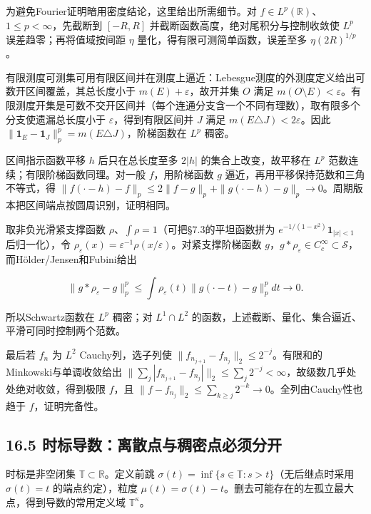 \documentclass[11pt,a4paper]{article}
\begin{document}
为避免Fourier证明暗用密度结论，这里给出所需细节。对
\(f\in L^p(\mathbb R)\)、\(1\le p<\infty\)，先截断到 \([-R,R]\)
并截断函数高度，绝对尾积分与控制收敛使 \(L^p\) 误差趋零；再将值域按间距
\(\eta\) 量化，得有限可测简单函数，误差至多 \(\eta(2R)^{1/p}\)。

有限测度可测集可用有限区间并在测度上逼近：Lebesgue测度的外测度定义给出可数开区间覆盖，其总长度小于
\(m(E)+\varepsilon\)，故开并集 \(O\) 满足
\(m(O\setminus E)<\varepsilon\)。有限测度开集是可数不交开区间并（每个连通分支含一个不同有理数），取有限多个分支使遗漏总长度小于
\(\varepsilon\)，得到有限区间并 \(J\) 满足
\(m(E\triangle J)<2\varepsilon\)。因此
\(\|\mathbf1_E-\mathbf1_J\|_p^p=m(E\triangle J)\)，阶梯函数在 \(L^p\)
稠密。

区间指示函数平移 \(h\) 后只在总长度至多 \(2|h|\) 的集合上改变，故平移在
\(L^p\) 范数连续；有限阶梯函数同理。对一般 \(f\)，用阶梯函数 \(g\)
逼近，再用平移保持范数和三角不等式，得
\(\|f(\cdot-h)-f\|_p\le2\|f-g\|_p+\|g(\cdot-h)-g\|_p\to0\)。周期版本把区间端点按圆周识别，证明相同。

取非负光滑紧支撑函数 \(\rho\)、\(\int\rho=1\)（可把§7.3的平坦函数拼为
\(e^{-1/(1-x^2)}\mathbf1_{|x|<1}\) 后归一化），令
\(\rho_\varepsilon(x)=\varepsilon^{-1}\rho(x/\varepsilon)\)。对紧支撑阶梯函数
\(g\)，\(g*\rho_\varepsilon\in C_c^\infty\subset\mathcal S\)，而Hölder/Jensen和Fubini给出

\[
\|g*\rho_\varepsilon-g\|_p^p
\le\int\rho_\varepsilon(t)\|g(\cdot-t)-g\|_p^pdt\to0.
\]

所以Schwartz函数在 \(L^p\) 稠密；对 \(L^1\cap L^2\)
的函数，上述截断、量化、集合逼近、平滑可同时控制两个范数。

最后若 \(f_n\) 为 \(L^2\) Cauchy列，选子列使
\(\|f_{n_{j+1}}-f_{n_j}\|_2\le2^{-j}\)。有限和的Minkowski与单调收敛给出
\(\|\sum_j|f_{n_{j+1}}-f_{n_j}|\|_2\le\sum_j2^{-j}<\infty\)，故级数几乎处处绝对收敛，得到极限
\(f\)，且
\(\|f-f_{n_j}\|_2\le\sum_{k\ge j}2^{-k}\to0\)。全列由Cauchy性也趋于
\(f\)，证明完备性。

\subsection{16.5
时标导数：离散点与稠密点必须分开}\label{ux65f6ux6807ux5bfcux6570ux79bbux6563ux70b9ux4e0eux7a20ux5bc6ux70b9ux5fc5ux987bux5206ux5f00}

时标是非空闭集 \(\mathbb T\subset\mathbb R\)。定义前跳
\(\sigma(t)=\inf\{s\in\mathbb T:s>t\}\)（无后继点时采用 \(\sigma(t)=t\)
的端点约定），粒度
\(\mu(t)=\sigma(t)-t\)。删去可能存在的左孤立最大点，得到导数的常用定义域
\(\mathbb T^\kappa\)。
\end{document}
